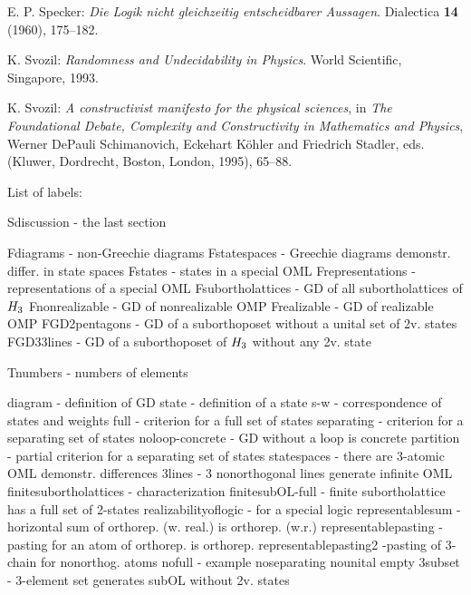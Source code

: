 \begin{thebibliography}{99}
E. P. Specker: {\em Die Logik nicht gleichzeitig entscheidbarer
Aussagen}. Dialectica
{\bf
14}
(1960),
175--182.

 K. Svozil:
{\em Randomness and Undecidability in Physics}. World Scientific, Singapore,
1993.

 K. Svozil:
{\em A constructivist manifesto for the physical  sciences}, in
{\em The Foundational Debate, Complexity and Constructivity in
Mathematics and Physics}, Werner DePauli Schimanovich, Eckehart K\"ohler
and Friedrich Stadler, eds. (Kluwer, Dordrecht, Boston, London, 1995),
65--88.
\end{thebibliography}






List of labels:

Sdiscussion - the last section

Fdiagrams - non-Greechie diagrams
Fstatespaces - Greechie diagrams demonstr. differ. in state spaces
Fstates - states in a special OML
Frepresentations - representations of a special OML
Fsubortholattices - GD of all subortholattices of $H_3$
Fnonrealizable - GD of nonrealizable OMP
Frealizable - GD of realizable OMP
FGD2pentagons - GD of a suborthoposet without a unital set of 2v. states
FGD33lines - GD of a suborthoposet of $H_3$ without any 2v. state

Tnumbers - numbers of elements

diagram  - definition of GD
state    - definition of a state
s-w      - correspondence of states and weights
full     - criterion for a full set of states
separating - criterion for a separating set of states
noloop-concrete - GD without a loop is concrete
partition - partial criterion for a separating set of states
statespaces - there are 3-atomic OML demonstr. differences
3lines - 3 nonorthogonal lines generate infinite OML
finitesubortholattices - characterization
finitesubOL-full - finite subortholattice has a full set of 2-states
realizabilityoflogic - for a special logic
representablesum - horizontal sum of orthorep. (w. real.) is orthorep. (w.r.)
representablepasting - pasting for an atom of orthorep. is orthorep.
representablepasting2 -pasting of 3-chain for nonorthog. atoms
nofull - example
noseparating
nounital
empty
3subset - 3-element set generates subOL without 2v. states

